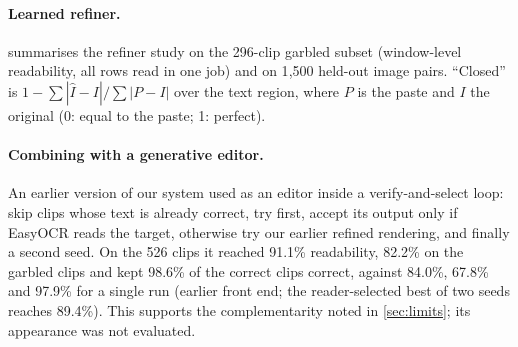 \paragraph{Learned refiner.} \label{sec:supp_refiner}  summarises the refiner study on the 296-clip garbled subset (window-level readability, all rows read in one job) and on 1{,}500 held-out image pairs. ``Closed'' is $1-\sum|\hat I-I|/\sum|P-I|$ over the text region, where $P$ is the paste and $I$ the original (0: equal to the paste; 1: perfect).

\begin{table}[h]
\centering
\caption{Learned refiner: data scale and supervision. Video: 296 garbled clips (Lab dist.: mean CIELAB distance to the original in the original ink region; lower is closer); image: 1{,}500 held-out pairs (our-font paste; ``closed$^\dagger$'' with the original's own glyph pasted).}
\label{tab:supp_ladder}
\small\setlength{\tabcolsep}{2.5pt}
\end{table}

\paragraph{Combining with a generative editor.} An earlier version of our system used \steer as an editor inside a verify-and-select loop: skip clips whose text is already correct, try \steer first, accept its output only if EasyOCR reads the target, otherwise try our earlier refined rendering, and finally a second \steer seed. On the 526 clips it reached 91.1\% readability, 82.2\% on the garbled clips and kept 98.6\% of the correct clips correct, against 84.0\%, 67.8\% and 97.9\% for a single \steer run (earlier front end; the reader-selected best of two \steer seeds reaches 89.4\%). This supports the complementarity noted in \cref{sec:limits}; its appearance was not evaluated.

